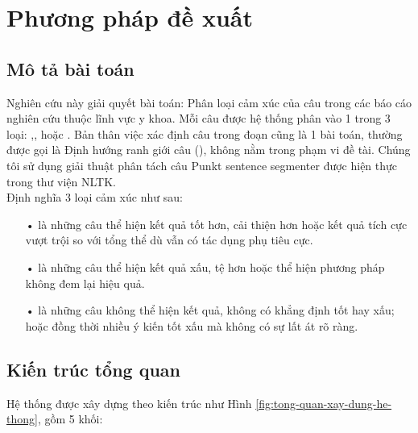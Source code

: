 \section{Phương pháp đề xuất}	\label{sec:phuongphapdexuat}
\subsection{Mô tả bài toán}
Nghiên cứu này giải quyết bài toán: Phân loại cảm xúc của câu trong các báo cáo nghiên cứu thuộc lĩnh vực y khoa. Mỗi câu được hệ thống phân vào 1 trong 3 loại: \tichcuc,\tieucuc, hoặc \trungtinh. Bản thân việc xác định câu trong đoạn cũng là 1 bài toán, thường được gọi là Định hướng ranh giới câu (), không nằm trong phạm vi đề tài. Chúng tôi sử dụng giải thuật phân tách câu Punkt sentence segmenter \cite{kiss2006unsupervised} được hiện thực trong thư viện NLTK.\\

Định nghĩa 3 loại cảm xúc như sau:
\begin{itemize}
\item[•] \tichcuc là những câu thể hiện kết quả tốt hơn, cải thiện hơn hoặc kết quả tích cực vượt trội so với tổng thể dù vẫn có tác dụng phụ tiêu cực.\\
\item[•] \tieucuc là những câu thể hiện kết quả xấu, tệ hơn hoặc thể hiện phương pháp không đem lại hiệu quả.\\
\item[•] \trungtinh là những câu không thể hiện kết quả, không có khẳng định tốt hay xấu; hoặc đồng thời nhiều ý kiến tốt xấu mà không có sự lất át rõ ràng.\\
\end{itemize}
\subsection{Kiến trúc tổng quan}
Hệ thống được xây dựng theo kiến trúc như Hình \ref{fig:tong-quan-xay-dung-he-thong}, gồm 5 khối:\\

